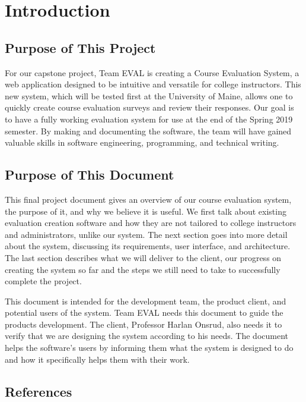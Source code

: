 \documentclass{article}
\begin{document}
\tableofcontents

\newpage

\section{Introduction}

\subsection{Purpose of This Project}

For our capstone project, Team EVAL is creating a Course Evaluation System, a web application designed to be intuitive and versatile for college instructors. This new system, which will be tested first at the University of Maine, allows one to quickly create course evaluation surveys and review their responses. Our goal is to have a fully working evaluation system for use at the end of the Spring 2019 semester. By making and documenting the software, the team will have gained valuable skills in software engineering, programming, and technical writing.

\subsection{Purpose of This Document}

This final project document gives an overview of our course evaluation system, the purpose of it, and why we believe it is useful. We first talk about existing evaluation creation software and how they are not tailored to college instructors and administrators, unlike our system. The next section goes into more detail about the system, discussing its requirements, user interface, and architecture. The last section describes what we will deliver to the client, our progress on creating the system so far and the steps we still need to take to successfully complete the project.

This document is intended for the development team, the product client, and potential users of the system. Team EVAL needs this document to guide the products development. The client, Professor Harlan Onsrud, also needs it to verify that we are designing the system according to his needs. The document helps the software's users by informing them what the system is designed to do and how it specifically helps them with their work.

\subsection{References}
\end{document}
